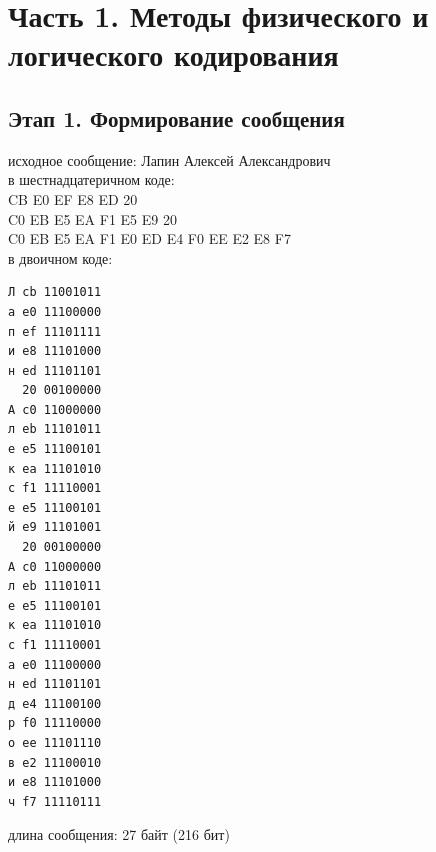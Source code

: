 \documentclass[12pt,onecolumn]{article}
\begin{document}
\section{Часть 1. Методы физического и логического кодирования}
\subsection{Этап 1. Формирование сообщения}
исходное сообщение: Лапин Алексей Александрович\\
в шестнадцатеричном коде: \\
CB E0 EF E8 ED 20\\
C0 EB E5 EA F1 E5 E9 20\\
C0 EB E5 EA F1 E0 ED E4 F0 EE E2 E8 F7\\
в двоичном коде:
\begin{verbatim}
Л cb 11001011
а e0 11100000
п ef 11101111
и e8 11101000
н ed 11101101
  20 00100000
А c0 11000000
л eb 11101011
е e5 11100101
к ea 11101010
с f1 11110001
е e5 11100101
й e9 11101001
  20 00100000
А c0 11000000
л eb 11101011
е e5 11100101
к ea 11101010
с f1 11110001
а e0 11100000
н ed 11101101
д e4 11100100
р f0 11110000
о ee 11101110
в e2 11100010
и e8 11101000
ч f7 11110111
\end{verbatim}
длина сообщения: 27 байт (216 бит)
\end{document}
